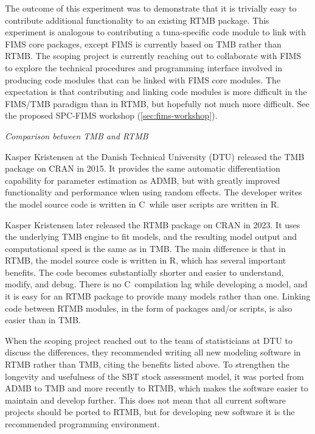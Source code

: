 \documentclass{SCreport}
\newcommand\cpp{\mbox{C\raisebox{0.5ex}{\tiny\bfseries ++}}}
\begin{document}
The outcome of this experiment was to demonstrate that it is trivially easy to
contribute additional functionality to an existing RTMB package. This experiment
is analogous to contributing a tuna-specific code module to link with FIMS core
packages, except FIMS is currently based on TMB rather than RTMB. The scoping
project is currently reaching out to collaborate with FIMS to explore the
technical procedures and programming interface involved in producing code
modules that can be linked with FIMS core modules. The expectation is that
contributing and linking code modules is more difficult in the FIMS/TMB paradigm
than in RTMB, but hopefully not much more difficult. See the proposed SPC-FIMS
workshop (\autoref{sec:fims-workshop}).

\vspace{2ex}

\textit{Comparison between TMB and RTMB}

Kasper Kristensen at the Danish Technical University (DTU) released the TMB
package on CRAN in 2015. It provides the same automatic differentiation
capability for parameter estimation as ADMB, but with greatly improved
functionality and performance when using random effects. The developer writes
the model source code is written in \cpp\, while user scripts are written in R.

Kasper Kristensen later released the RTMB package on CRAN in 2023. It uses the
underlying TMB engine to fit models, and the resulting model output and
computational speed is the same as in TMB. The main difference is that in RTMB,
the model source code is written in R, which has several important benefits. The
code becomes substantially shorter and easier to understand, modify, and debug.
There is no \cpp\ compilation lag while developing a model, and it is easy for
an RTMB package to provide many models rather than one. Linking code between
RTMB modules, in the form of packages and/or scripts, is also easier than in
TMB.

When the scoping project reached out to the team of statisticians at DTU to
discuss the differences, they recommended writing all new modeling software in
RTMB rather than TMB, citing the benefits listed above. To strengthen the
longevity and usefulness of the SBT stock assessment model, it was ported from
ADMB to TMB and more recently to RTMB, which makes the software easier to
maintain and develop further. This does not mean that all current software
projects should be ported to RTMB, but for developing new software it is the
recommended programming environment.
\end{document}
